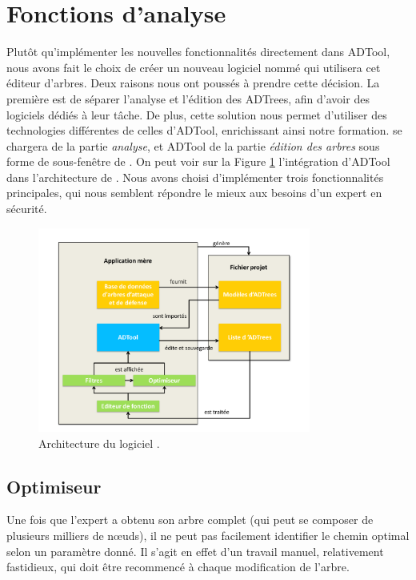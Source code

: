 \section{Fonctions d'analyse}

	Plutôt qu'implémenter les nouvelles fonctionnalités directement dans ADTool, nous avons fait le choix de créer un nouveau logiciel nommé \glasir qui utilisera cet éditeur d'arbres. Deux raisons nous ont poussés à prendre cette décision. La première est de séparer l'analyse et l'édition des ADTrees, afin d'avoir des logiciels dédiés à leur tâche. De plus, cette solution nous permet d'utiliser des technologies différentes de celles d'ADTool, enrichissant ainsi notre formation. \glasir se chargera de la partie \textit{analyse}, et ADTool de la partie \textit{édition des arbres} sous forme de sous-fenêtre de \glasir. On peut voir sur la {\sc Figure} \ref{fig:architecture_Glasir} l'intégration d'ADTool dans l'architecture de \glasir. Nous avons choisi d'implémenter trois fonctionnalités principales, qui nous semblent répondre le mieux aux besoins d'un expert en sécurité.

	\begin{figure}[h!]
		\centering
			\includegraphics[width=0.8\textwidth]{figure/archiGlasir.pdf}
		\caption{Architecture du logiciel \glasir.}
		\label{fig:architecture_Glasir}
	\end{figure}

	\subsection{Optimiseur}
		\label{subsection:optimiseur}

		Une fois que l'expert a obtenu son arbre complet (qui peut se composer de plusieurs milliers de nœuds), il ne peut pas facilement identifier le chemin optimal selon un paramètre donné. Il s'agit en effet d'un travail manuel, relativement fastidieux, qui doit être recommencé à chaque modification de l'arbre.
		
